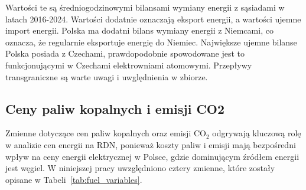 \begin{table}[H]
    \centering
    \caption{Średni bilans wymiany energii z sąsiadami w latach 2016-2024}
    \label{tab:energy-trade-balance}
\end{table}

Wartości te są średniogodzinowymi bilansami wymiany energii z sąsiadami w latach 2016-2024. Wartości dodatnie oznaczają eksport energii, a wartości ujemne import energii. Polska ma dodatni bilans wymiany energii z Niemcami, co oznacza, że regularnie eksportuje energię do Niemiec. Największe ujemne bilanse Polska posiada z Czechami, prawdopodobnie spowodowane jest to funkcjonującymi w Czechami elektrowniami atomowymi. Przepływy transgraniczne są warte uwagi i uwględnienia w zbiorze.

\subsection{Ceny paliw kopalnych i emisji CO2}
\label{subsec:prices}

Zmienne dotyczące cen paliw kopalnych oraz emisji CO$_2$ odgrywają kluczową rolę w analizie cen energii na RDN, ponieważ koszty paliw i emisji mają bezpośredni wpływ na ceny energii elektrycznej w Polsce, gdzie dominującym źródłem energii jest węgiel. W niniejszej pracy uwzględniono cztery zmienne, które zostały opisane w Tabeli~\ref{tab:fuel_variables}.

